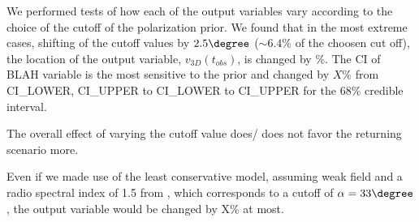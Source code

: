 We performed tests of how each of the output variables vary according to the
choice of the cutoff of the polarization prior.
We found that in the most extreme cases, shifting of the cutoff values by
$2.5\degree$ ($\sim 6.4\%$ of the choosen cut off), the location of the output
variable, $v_{3D}(t_{obs})$, is changed by $\%$. The CI of BLAH variable is the most
sensitive to the prior and changed by $X\%$ from CI_LOWER, CI_UPPER to
CI_LOWER to CI_UPPER for the $68\%$ credible interval. 

The overall effect of varying the cutoff value does/ does not favor the
returning scenario more. 

Even if we made use of the least conservative model, assuming weak field
and a radio spectral index of 1.5 from \cite{E98}, which
corresponds to a cutoff of $\alpha = 33\degree$, the output variable would
be changed by X\% at most. 





